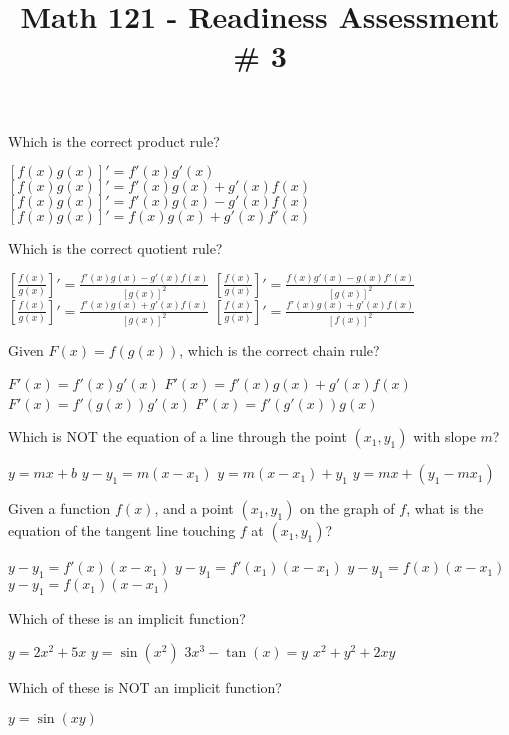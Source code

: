 \documentclass{exam}
\title{Math 121 - Readiness Assessment \# 3}
\date{}
\begin{document}
\maketitle

\begin{questions}
\question Which is the correct product rule?
\begin{choices}
\choice $[f(x)g(x)]' = f'(x)g'(x)$
\choice $[f(x)g(x)]' = f'(x)g(x) + g'(x)f(x)$
\choice $[f(x)g(x)]' = f'(x)g(x) - g'(x)f(x)$
\choice $[f(x)g(x)]' = f(x)g(x) + g'(x)f'(x)$
\end{choices}
\question Which is the correct quotient rule?
\begin{choices}
\choice $\left[\frac{f(x)}{g(x)}\right]' = \frac{f'(x)g(x) - g'(x)f(x)}{[g(x)]^2}$
\choice $\left[\frac{f(x)}{g(x)}\right]' = \frac{f(x)g'(x) - g(x)f'(x)}{[g(x)]^2}$
\choice $\left[\frac{f(x)}{g(x)}\right]' = \frac{f'(x)g(x) + g'(x)f(x)}{[g(x)]^2}$
\choice $\left[\frac{f(x)}{g(x)}\right]' = \frac{f'(x)g(x) + g'(x)f(x)}{[f(x)]^2}$
\end{choices}
\question Given $F(x) = f(g(x))$, which is the correct chain rule?
\begin{choices}
\choice $F'(x) = f'(x)g'(x)$
\choice $F'(x) = f'(x)g(x) + g'(x)f(x)$
\choice $F'(x) = f'(g(x))g'(x)$
\choice $F'(x) = f'(g'(x))g(x)$
\end{choices}
\question Which is NOT the equation of a line through the point $(x_1,y_1)$ with slope $m$?
\begin{choices}
\choice $y = mx + b$
\choice $y - y_1 = m(x - x_1)$
\choice $y = m(x - x_1) + y_1$
\choice $y = mx + (y_1-mx_1)$
\end{choices}
\question Given a function $f(x)$, and a point $(x_1,y_1)$ on the graph of $f$, what is the equation of the tangent line touching $f$ at $(x_1,y_1)$?
\begin{choices}
\choice $y - y_1 = f'(x)(x - x_1)$
\choice $y - y_1 = f'(x_1)(x - x_1)$
\choice $y - y_1 = f(x)(x - x_1)$
\choice $y - y_1 = f(x_1)(x - x_1)$
\end{choices}
\question Which of these is an implicit function?\\
\begin{oneparchoices}
\choice $y = 2x^2 + 5x$
\choice $y = \sin(x^2)$
\choice $3x^3 - \tan(x) = y$
\choice $x^2 + y^2 + 2xy$
\end{oneparchoices}
\question Which of these is NOT an implicit function?\\
\begin{oneparchoices}
\choice $y = \sin(xy)$

\end{oneparchoices}
\end{questions}
\end{document}

